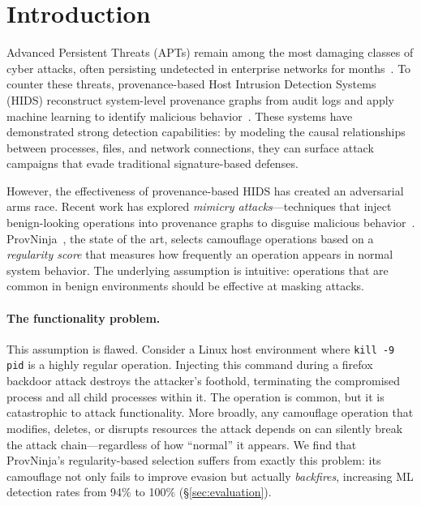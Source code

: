 \section{Introduction}
\label{sec:introduction}

Advanced Persistent Threats (APTs) remain among the most damaging classes of cyber attacks, often persisting undetected in enterprise networks for months~\cite{provdetector,hrat}.
To counter these threats, provenance-based Host Intrusion Detection Systems (HIDS) reconstruct system-level provenance graphs from audit logs and apply machine learning to identify malicious behavior~\cite{unicorn,shadewatcher,threatrace}.
These systems have demonstrated strong detection capabilities: by modeling the causal relationships between processes, files, and network connections, they can surface attack campaigns that evade traditional signature-based defenses.

However, the effectiveness of provenance-based HIDS has created an adversarial arms race.
Recent work has explored \emph{mimicry attacks}---techniques that inject benign-looking operations into provenance graphs to disguise malicious behavior~\cite{provninja,malguise}.
ProvNinja~\cite{provninja}, the state of the art, selects camouflage operations based on a \emph{regularity score} that measures how frequently an operation appears in normal system behavior.
The underlying assumption is intuitive: operations that are common in benign environments should be effective at masking attacks.

\paragraph{The functionality problem.}
This assumption is flawed.
Consider a Linux host environment where \texttt{kill -9 \textlangle pid\textrangle} is a highly regular operation.
Injecting this command during a firefox backdoor attack destroys the attacker's foothold, terminating the compromised process and all child processes within it.
The operation is common, but it is catastrophic to attack functionality.
More broadly, any camouflage operation that modifies, deletes, or disrupts resources the attack depends on can silently break the attack chain---regardless of how ``normal'' it appears.
We find that ProvNinja's regularity-based selection suffers from exactly this problem: its camouflage not only fails to improve evasion but actually \emph{backfires}, increasing ML detection rates from 94\% to 100\% (\S\ref{sec:evaluation}).

